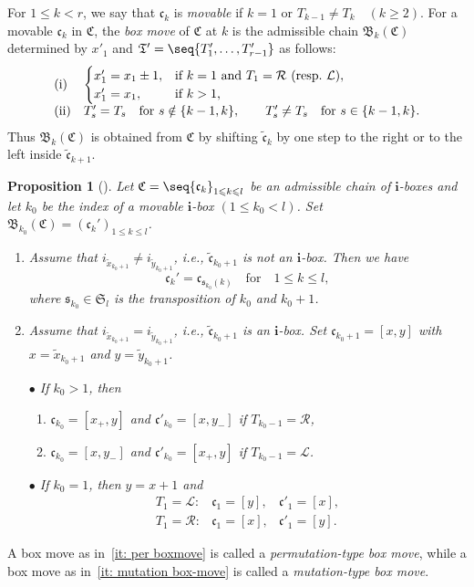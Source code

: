 \documentclass[12pt, leqno]{amsart}
\numberwithin{equation}{section}
\theoremstyle{plain}
\newtheorem{proposition}[lemma]{Proposition}
\theoremstyle{definition}
\renewcommand{\le}{\leqslant}
\renewcommand{\ge}{\geqslant}
\newcommand{\tx}{\widetilde{x}}
\newcommand{\ty}{\widetilde{y}}
\newcommand{\frakB}{\mathfrak{B}}
\newcommand{\frakC}{\mathfrak{C}}
\newcommand{\frakS}{\mathfrak{S}}
\newcommand{\frakT}{\mathfrak{T}}
\newcommand{\frakc}{\mathfrak{c}}
\newcommand{\fraks}{\mathfrak{s}}
\newcommand{\tfrakc}{\widetilde{\frakc}}
\newcommand{\bfi}{\mathbf{i}}
\newcommand{\calL}{\mathcal{L}}
\newcommand{\calR}{\mathcal{R}}
\newcommand{\ee}{\end{enumerate}}
\newcommand{\bnum}{\begin{enumerate}[{\rm (i)}]}
\newcommand{\bna}{\begin{enumerate}[{\rm (a)}]}
\begin{document}
For $1\le k<r$, we say that $\frakc_k$ is \emph{movable} if
$k=1$ or $T_{k-1}\neq T_k \quad (k\ge2)$.
For a movable $\frakc_k$ in $\frakC$, the \emph{box move} of
$\frakC$ at $k$ is the admissible chain $\frakB_k(\frakC)$
determined by $x'_1$ and
$\frakT'=\seq{T'_1,\ldots,T'_{r-1}}$ as follows:
\[
\begin{array}{ll}
{\rm (i)}&
\begin{cases}
x_1'=x_1\pm1, & \text{if $k=1$ and $T_1=\calR$ (resp.\ $\calL$)},\\
x_1'=x_1, & \text{if $k>1$,}
\end{cases}
\\
{\rm (ii)} & T'_s=T_s \quad\text{for }s\notin\{k-1,k\},  \qquad T'_s\neq T_s \quad\text{for }s\in\{k-1,k\}.
\end{array}
\]
Thus $\frakB_k(\frakC)$ is obtained from $\frakC$ by shifting
$\tfrakc_k$ by one step to the right or to the left inside
$\tfrakc_{k+1}$.

\begin{proposition} [{\cite[Proposition 5.6, Proposition 5.7]{KKOP24A}}] \label{prop:boxmove}
Let $\frakC=\seq{\frakc_k}_{1 \le k \le l}$ be an admissible chain of
$\bfi$-boxes and let $k_0$ be the index of 
a movable $\bfi$-box $(1\le k_0<l)$. Set
$\frakB_{k_0}(\frakC) = (\frakc_k')_{1 \le k \le l}$.
\bnum
\item \label{it: per boxmove}
Assume that $i_{\tx_{k_0+1}} \ne i_{\ty_{k_0+1}}$, i.e., $\tfrakc_{k_0+1}$ is
not an $\bfi$-box. Then we have
$$\frakc_k' = \frakc_{\fraks_{k_0}(k)} \quad \text{for}\quad 1\le k \le l, $$
where $\fraks_{k_0} \in \frakS_l$ is the transposition of $k_0$
and $k_0+1$.
\item \label{it: mutation box-move} Assume that $i_{\tx_{k_0+1}}=i_{\ty_{k_0+1}}$, i.e., $\tfrakc_{k_0+1}$ is an $\bfi$-box.
Set $\frakc_{k_0+1}=[x,y]$ with $x=\tx_{k_0+1}$ and $y=\ty_{k_0+1}$.

\noindent
$\bullet$ If $k_0>1$, then
\bna
\item $\frakc_{k_0}=[x_+,y]$ and $\frakc'_{k_0}=[x,y_-]$ if $T_{k_0-1}=\calR$,
\item $\frakc_{k_0}=[x,y_-]$ and $\frakc'_{k_0}=[x_+,y]$ if $T_{k_0-1}=\calL$.
\ee
\noindent
$\bullet$ If $k_0=1$, then $y=x+1$ and
\[
\begin{array}{lll}
T_1=\calL:& \frakc_1=[y],& \frakc'_1=[x],\\
T_1=\calR:& \frakc_1=[x],& \frakc'_1=[y].
\end{array}
\]
\ee
\end{proposition}
A box move as in~\eqref{it: per boxmove} is called a \emph{permutation-type box move},
while a box move as in~\eqref{it: mutation box-move} is called a \emph{mutation-type box move}.
\end{document}
